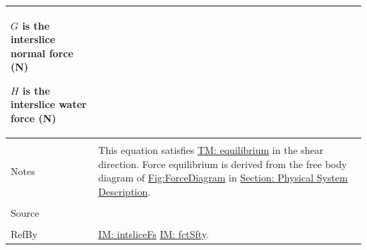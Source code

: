 \documentclass[12pt]{article}
\begin{document}
\begin{minipage}{\textwidth}
\begin{tabular}{p{} p{}}
\begin{symbDescription}
                                 \item{$G$ is the interslice normal force (N)}
                                 \item{$H$ is the interslice water force (N)}
                                 \end{symbDescription}
                                 \\ \midrule \\
                                 Notes & This equation satisfies \hyperref[TM:equilibrium]{TM: equilibrium} in the shear direction. Force equilibrium is derived from the free body diagram of \hyperref[Figure:ForceDiagram]{Fig:ForceDiagram} in \hyperref[Sec:PhysSyst]{Section: Physical System Description}.
                                         \\ \midrule \\
                                         Source & \cite{chen2005}
                                                  \\ \midrule \\
                                                  RefBy & \hyperref[IM:intsliceFs]{IM: intsliceFs} \hyperref[IM:fctSfty]{IM: fctSfty}.
\\ \bottomrule \end{tabular}
\end{minipage}\\
~\newline
\end{document}

